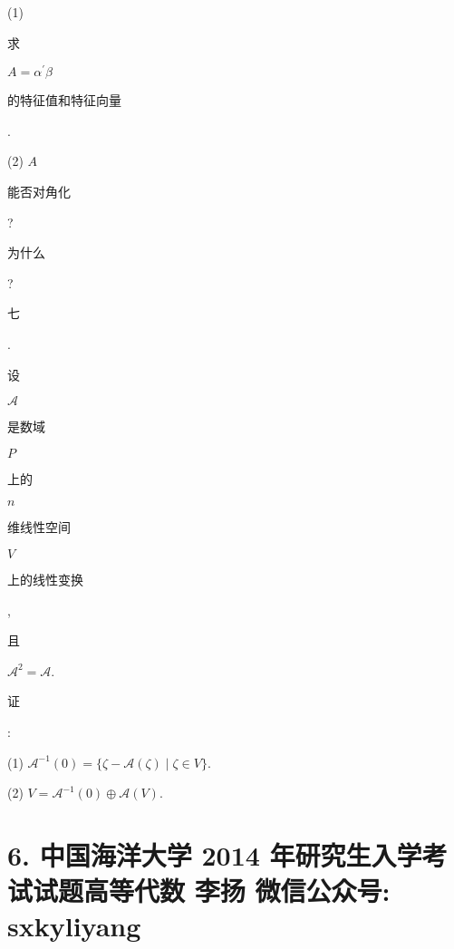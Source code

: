 \documentclass[10pt]{article}
\begin{document}
(1) \begin{CJK}{UTF8}{mj}求\end{CJK} $A=\alpha^{\prime} \beta$ \begin{CJK}{UTF8}{mj}的特征值和特征向量\end{CJK}.

(2) $A$ \begin{CJK}{UTF8}{mj}能否对角化\end{CJK}? \begin{CJK}{UTF8}{mj}为什么\end{CJK}?

\begin{CJK}{UTF8}{mj}七\end{CJK}. \begin{CJK}{UTF8}{mj}设\end{CJK} $\mathscr{A}$ \begin{CJK}{UTF8}{mj}是数域\end{CJK} $P$ \begin{CJK}{UTF8}{mj}上的\end{CJK} $n$ \begin{CJK}{UTF8}{mj}维线性空间\end{CJK} $V$ \begin{CJK}{UTF8}{mj}上的线性变换\end{CJK}, \begin{CJK}{UTF8}{mj}且\end{CJK} $\mathscr{A}^{2}=\mathscr{A}$. \begin{CJK}{UTF8}{mj}证\end{CJK}:

(1) $\mathscr{A}^{-1}(0)=\{\zeta-\mathscr{A}(\zeta) \mid \zeta \in V\}$.

(2) $V=\mathscr{A}^{-1}(0) \oplus \mathscr{A}(V)$.

\section{6. 中国海洋大学 2014 年研究生入学考试试题高等代数 
 李扬 
 微信公众号: sxkyliyang}
\end{document}
